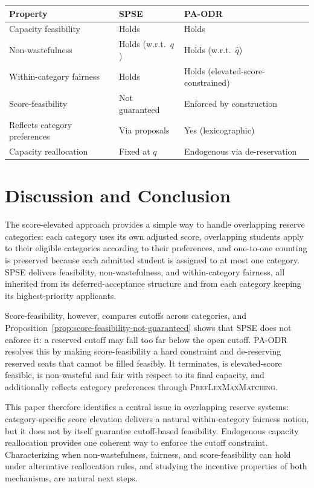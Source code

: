 \documentclass[10pt]{article}
\newcommand{\1}{\mathbf{1}}
\begin{document}
\begin{center}
\renewcommand{\arraystretch}{1.3}
\begin{tabular}{lll}
\toprule
\textbf{Property} & \textbf{SPSE} & \textbf{PA-ODR} \\
\midrule
Capacity feasibility & Holds & Holds \\
Non-wastefulness & Holds (w.r.t.\ $q$) & Holds (w.r.t.\ $\hat q$) \\
Within-category fairness & Holds & Holds (elevated-score-constrained) \\
Score-feasibility & Not guaranteed & Enforced by construction \\
Reflects category preferences & Via proposals & Yes (lexicographic) \\
Capacity reallocation & Fixed at $q$ & Endogenous via de-reservation \\
\bottomrule
\end{tabular}
\end{center}

\section{Discussion and Conclusion}

The score-elevated approach provides a simple way to handle overlapping reserve categories: each category uses its own adjusted score, overlapping students apply to their eligible categories according to their preferences, and one-to-one counting is preserved because each admitted student is assigned to at most one category. SPSE delivers feasibility, non-wastefulness, and within-category fairness, all inherited from its deferred-acceptance structure and from each category keeping its highest-priority applicants.

Score-feasibility, however, compares cutoffs across categories, and Proposition~\ref{prop:score-feasibility-not-guaranteed} shows that SPSE does not enforce it: a reserved cutoff may fall too far below the open cutoff. PA-ODR resolves this by making score-feasibility a hard constraint and de-reserving reserved seats that cannot be filled feasibly. It terminates, is elevated-score feasible, is non-wasteful and fair with respect to its final capacity, and additionally reflects category preferences through \textsc{PrefLexMaxMatching}.

This paper therefore identifies a central issue in overlapping reserve systems: category-specific score elevation delivers a natural within-category fairness notion, but it does not by itself guarantee cutoff-based feasibility. Endogenous capacity reallocation provides one coherent way to enforce the cutoff constraint. Characterizing when non-wastefulness, fairness, and score-feasibility can hold under alternative reallocation rules, and studying the incentive properties of both mechanisms, are natural next steps.
\end{document}

